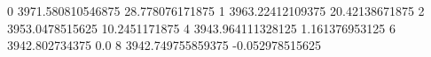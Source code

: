 0 3971.580810546875 28.778076171875
1 3963.22412109375 20.42138671875
2 3953.0478515625 10.2451171875
4 3943.964111328125 1.161376953125
6 3942.802734375 0.0
8 3942.749755859375 -0.052978515625
